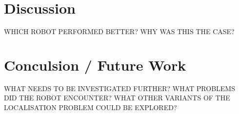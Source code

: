 \documentclass[a4paper]{article}
\begin{document}
\section{Discussion}
WHICH ROBOT PERFORMED BETTER? WHY WAS THIS THE CASE?

\section{Conculsion / Future Work}
WHAT NEEDS TO BE INVESTIGATED FURTHER? WHAT PROBLEMS DID THE ROBOT ENCOUNTER? WHAT OTHER VARIANTS OF THE LOCALISATION PROBLEM COULD BE EXPLORED? 

\newpage



\end{document}

